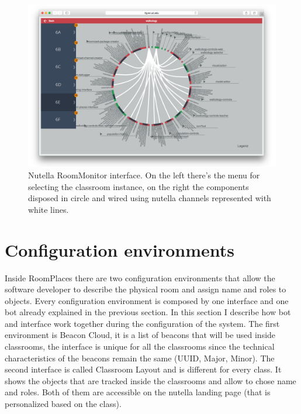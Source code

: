 \begin{figure}
\centering
\includegraphics[width=6in]{images/nutella-monitor.png}
\caption{Nutella RoomMonitor interface. On the left there's the menu for selecting the classroom instance, on the right the components disposed in circle and wired using nutella channels represented with white lines.}
\label{fig:nutella_monitor}
\end{figure}

\section{Configuration environments}
Inside RoomPlaces there are two configuration environments that allow the software developer to describe the physical room and assign name and roles to objects. Every configuration environment is composed by one interface and one bot already explained in the previous section. In this section I describe how bot and interface work together during the configuration of the system. The first environment is Beacon Cloud, it is a list of beacons that will be used inside classrooms, the interface is unique for all the classrooms since the technical characteristics of the beacons remain the same (UUID, Major, Minor). The second interface is called Classroom Layout and is different for every class. It shows the objects that are tracked inside the classrooms and allow to chose name and roles. Both of them are accessible on the nutella landing page (that is personalized based on the class).

